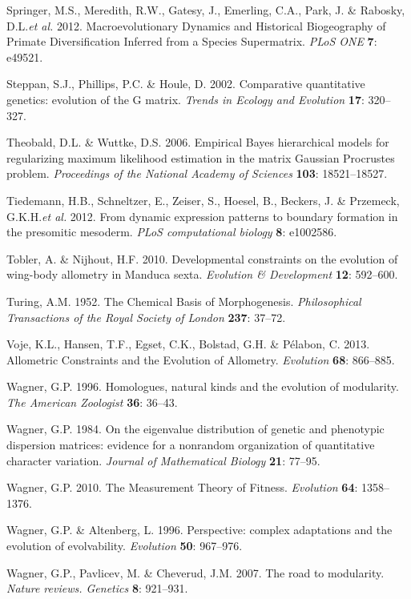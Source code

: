 \documentclass[12pt,twoside]{report}
\begin{document}
Springer, M.S., Meredith, R.W., Gatesy, J., Emerling, C.A., Park, J. \&
Rabosky, D.L.\emph{et al.} 2012. Macroevolutionary Dynamics and
Historical Biogeography of Primate Diversification Inferred from a
Species Supermatrix. \emph{PLoS ONE} \textbf{7}: e49521.

Steppan, S.J., Phillips, P.C. \& Houle, D. 2002. Comparative
quantitative genetics: evolution of the G matrix. \emph{Trends in
Ecology and Evolution} \textbf{17}: 320--327.

Theobald, D.L. \& Wuttke, D.S. 2006. Empirical Bayes hierarchical models
for regularizing maximum likelihood estimation in the matrix Gaussian
Procrustes problem. \emph{Proceedings of the National Academy of
Sciences} \textbf{103}: 18521--18527.

Tiedemann, H.B., Schneltzer, E., Zeiser, S., Hoesel, B., Beckers, J. \&
Przemeck, G.K.H.\emph{et al.} 2012. From dynamic expression patterns to
boundary formation in the presomitic mesoderm. \emph{PLoS computational
biology} \textbf{8}: e1002586.

Tobler, A. \& Nijhout, H.F. 2010. Developmental constraints on the
evolution of wing-body allometry in Manduca sexta. \emph{Evolution \&
Development} \textbf{12}: 592--600.

Turing, A.M. 1952. The Chemical Basis of Morphogenesis.
\emph{Philosophical Transactions of the Royal Society of London}
\textbf{237}: 37--72.

Voje, K.L., Hansen, T.F., Egset, C.K., Bolstad, G.H. \& Pélabon, C.
2013. Allometric Constraints and the Evolution of Allometry.
\emph{Evolution} \textbf{68}: 866--885.

Wagner, G.P. 1996. Homologues, natural kinds and the evolution of
modularity. \emph{The American Zoologist} \textbf{36}: 36--43.

Wagner, G.P. 1984. On the eigenvalue distribution of genetic and
phenotypic dispersion matrices: evidence for a nonrandom organization of
quantitative character variation. \emph{Journal of Mathematical Biology}
\textbf{21}: 77--95.

Wagner, G.P. 2010. The Measurement Theory of Fitness. \emph{Evolution}
\textbf{64}: 1358--1376.

Wagner, G.P. \& Altenberg, L. 1996. Perspective: complex adaptations and
the evolution of evolvability. \emph{Evolution} \textbf{50}: 967--976.

Wagner, G.P., Pavlicev, M. \& Cheverud, J.M. 2007. The road to
modularity. \emph{Nature reviews. Genetics} \textbf{8}: 921--931.
\end{document}
